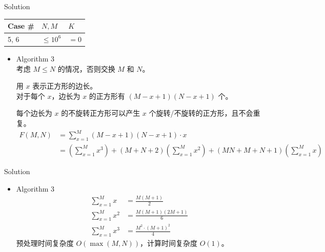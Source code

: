 \documentclass[UTF8]{beamer}
\begin{document}
\begin{frame}{Solution}

\begin{tabularx}{\textwidth}{X|X|X} \hline
Case \# & $N, M$ & $K$ \\ \hline \hline
5, 6   & $\leq 10^6$ & $= 0$                \\ \hline
\end{tabularx}
\begin{itemize}
    \item Algorithm 3 \\
        考虑 $M \leq N$ 的情况，否则交换 $M$ 和 $N$。

        \pause
        用 $x$ 表示正方形的边长。 \\
        对于每个 $x$，边长为 $x$ 的正方形有 $(M - x + 1)(N - x + 1)$ 个。

        \pause
        每个边长为 $x$ 的不旋转正方形可以产生 $x$ 个旋转/不旋转的正方形，且不会重复。
        \begin{align*}
            F(M, N) &= \sum_{x = 1}^{M} (M - x + 1)(N - x + 1) \cdot x \\
                    &= (\sum_{x = 1}^{M} x^3) +
                        (M + N + 2) (\sum_{x = 1}^{M} x^2) +
                        (MN + M + N + 1) (\sum_{x = 1}^{M} x)
        \end{align*}
\end{itemize}

\end{frame}

\begin{frame}{Solution}

\begin{itemize}
    \item Algorithm 3 \\
        \begin{align*}
            \sum_{x = 1}^{M} x  &= \frac{M(M+1)}{2} \\
            \sum_{x = 1}^{M} x^2 &= \frac{M(M+1)(2M+1)}{6} \\
            \sum_{x = 1}^{M} x^3 &= \frac{M^2 \cdot (M+1)^2}{4}
        \end{align*}
        \pause
        预处理时间复杂度 $O(\max(M, N))$，计算时间复杂度 $O(1)$。
\end{itemize}

\end{frame}
\end{document}
